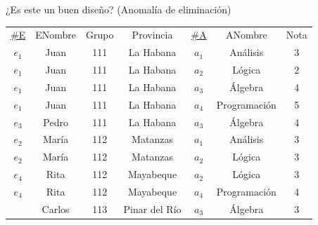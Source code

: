 \begin{frame}{¿Es este un buen dise\~no? (Anomal\'ia de eliminaci\'on)}
    \centering
    \begin{tabular}{ccccccc}
        \underline{\#E} & ENombre & Grupo & Provincia & \underline{\#A} & ANombre & Nota\\
        $e_1$ & Juan & 111 & La Habana & $a_1$ & An\'alisis & 3\\
        $e_1$ & Juan & 111 & La Habana & $a_2$ & L\'ogica & 2\\
        $e_1$ & Juan & 111 & La Habana  & $a_3$ & \'Algebra & 4\\
        $e_1$ & Juan & 111 & La Habana & $a_4$ & Programaci\'on & 5\\
        $e_3$ & Pedro & 111 & La Habana & $a_3$ & \'Algebra & 4\\
        $e_2$ & Mar\'ia & 112 &  Matanzas & $a_1$ & An\'alisis & 3\\
        $e_2$ & Mar\'ia &  112 & Matanzas & $a_2$ & L\'ogica & 3\\
        $e_4$ & Rita & 112 & Mayabeque & $a_2$ & L\'ogica & 3\\
        $e_4$ & Rita &  112 & Mayabeque & $a_4$ & Programaci\'on & 4\\
        \onslide<-1>{
        $e_5$ & Carlos &  113 & Pinar del R\'io & $a_3$ & \'Algebra & 3
        }
    \end{tabular}
    \vspace{5mm}


\end{frame}


